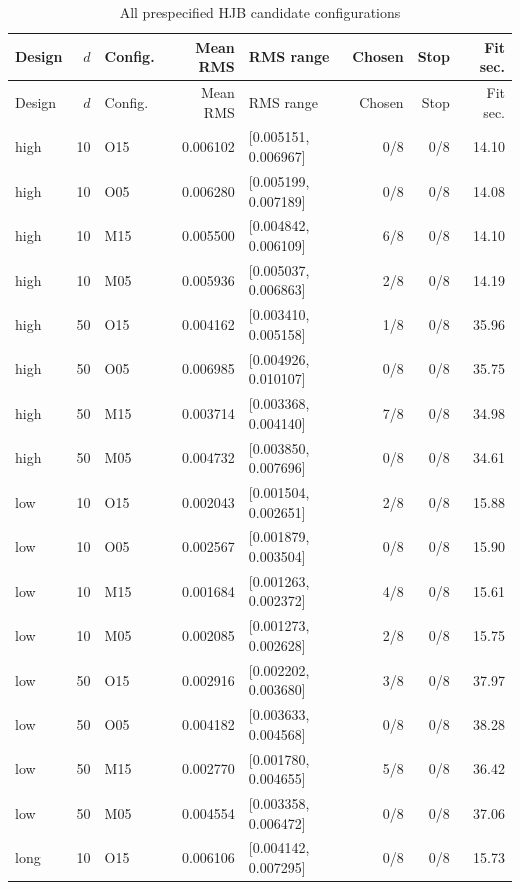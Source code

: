 \begingroup\small
\setlength{\tabcolsep}{3pt}
\begin{longtable}{lrlrlrrr}
\caption{All prespecified HJB candidate configurations}\label{tab:r16hjbconfigurations}\\
\toprule
Design & $d$ & Config. & Mean RMS & RMS range & Chosen & Stop & Fit sec. \\
\midrule
\endfirsthead
\toprule
Design & $d$ & Config. & Mean RMS & RMS range & Chosen & Stop & Fit sec. \\
\midrule
\endhead
high & 10 & O15 & 0.006102 & [0.005151, 0.006967] & 0/8 & 0/8 & 14.10 \\
high & 10 & O05 & 0.006280 & [0.005199, 0.007189] & 0/8 & 0/8 & 14.08 \\
high & 10 & M15 & 0.005500 & [0.004842, 0.006109] & 6/8 & 0/8 & 14.10 \\
high & 10 & M05 & 0.005936 & [0.005037, 0.006863] & 2/8 & 0/8 & 14.19 \\
high & 50 & O15 & 0.004162 & [0.003410, 0.005158] & 1/8 & 0/8 & 35.96 \\
high & 50 & O05 & 0.006985 & [0.004926, 0.010107] & 0/8 & 0/8 & 35.75 \\
high & 50 & M15 & 0.003714 & [0.003368, 0.004140] & 7/8 & 0/8 & 34.98 \\
high & 50 & M05 & 0.004732 & [0.003850, 0.007696] & 0/8 & 0/8 & 34.61 \\
low & 10 & O15 & 0.002043 & [0.001504, 0.002651] & 2/8 & 0/8 & 15.88 \\
low & 10 & O05 & 0.002567 & [0.001879, 0.003504] & 0/8 & 0/8 & 15.90 \\
low & 10 & M15 & 0.001684 & [0.001263, 0.002372] & 4/8 & 0/8 & 15.61 \\
low & 10 & M05 & 0.002085 & [0.001273, 0.002628] & 2/8 & 0/8 & 15.75 \\
low & 50 & O15 & 0.002916 & [0.002202, 0.003680] & 3/8 & 0/8 & 37.97 \\
low & 50 & O05 & 0.004182 & [0.003633, 0.004568] & 0/8 & 0/8 & 38.28 \\
low & 50 & M15 & 0.002770 & [0.001780, 0.004655] & 5/8 & 0/8 & 36.42 \\
low & 50 & M05 & 0.004554 & [0.003358, 0.006472] & 0/8 & 0/8 & 37.06 \\
long & 10 & O15 & 0.006106 & [0.004142, 0.007295] & 0/8 & 0/8 & 15.73 \\

\end{longtable}
